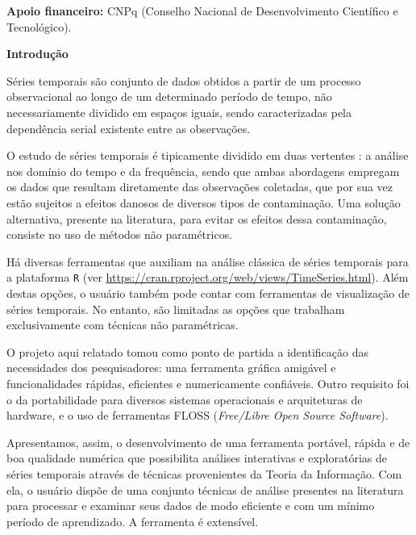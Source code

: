 \documentclass[12pt]{article}
\begin{document}

\textbf{Apoio financeiro:} CNPq (Conselho Nacional de Desenvolvimento Científico e Tecnológico).


\textbf{Introdução}

Séries temporais são conjunto de dados obtidos a partir de um processo observacional ao longo de um determinado período de tempo, não necessariamente dividido em espaços iguais, sendo caracterizadas pela dependência serial existente entre as observações.
 
O estudo de séries temporais é tipicamente dividido em duas vertentes \cite{BrockwellDavis91}: a análise nos domínio do tempo e da frequência, sendo que ambas abordagens empregam os dados que resultam diretamente das observações coletadas, que por sua vez estão sujeitos a efeitos danosos de diversos tipos de contaminação. 
Uma solução alternativa, presente na literatura, para evitar os efeitos dessa contaminação, consiste no uso de métodos não paramétricos.

Há diversas ferramentas que auxiliam na análise clássica de séries temporais para a plataforma \texttt  R (ver \url{https://cran.rproject.org/web/views/TimeSeries.html}). 
Além destas opções, o usuário também pode contar com ferramentas de visualização de séries temporais. No entanto, são limitadas as opções que trabalham exclusivamente com técnicas não paramétricas. 
    
O projeto aqui relatado tomou como ponto de partida a identificação das necessidades dos pesquisadores: uma ferramenta gráfica amigável e funcionalidades rápidas, eficientes e numericamente confiáveis.
Outro requisito foi o da portabilidade para diversos sistemas operacionais e arquiteturas de hardware, e o uso de ferramentas FLOSS (\textit{Free/Libre Open Source Software}).
 
Apresentamos, assim, o desenvolvimento de uma ferramenta portável, rápida e de boa qualidade numérica que possibilita análises interativas e exploratórias de séries temporais através de técnicas provenientes da Teoria da Informação.
Com ela, o usuário dispõe de uma conjunto técnicas de análise presentes na literatura para processar e examinar seus dados de modo eficiente e com um mínimo período de aprendizado.
A ferramenta é extensível.
\end{document}
